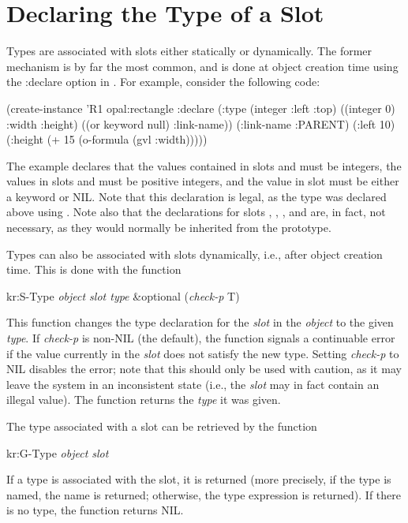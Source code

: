 \section{Declaring the Type of a Slot}


Types are associated with slots either statically or dynamically.  The
former mechanism is by far the most common, and is done at object
creation time using the {\sc :declare} option in .
For example, consider the following code:

\vspace{1 line}
\begin{programexample}
(create-instance 'R1 opal:rectangle
  :declare (:type (integer :left :top)
		  ((integer 0) :width :height)
		  ((or keyword null) :link-name))
  (:link-name :PARENT)
  (:left 10) (:height (+ 15 (o-formula (gvl :width)))))
\end{programexample}

The example declares that the values contained in slots  and
 must be integers, the values in slots  and
 must be positive integers, and the value in slot
 must be either a keyword or NIL.  Note that this
declaration is legal, as the type  was declared
above using .  Note also that the declarations for
slots , , , and  are, in fact,
not necessary, as they would normally be inherited from the prototype.


Types can also be associated with slots dynamically, i.e., after
object creation time.  This is done with the function
\begin{example}
kr:S-Type {\it object slot type} \&optional ({\it check-p} T) \value{function}
\end{example}

This function changes the type declaration for the {\it slot} in the
{\it object} to the given {\it type}.  If {\it check-p} is non-NIL (the
default), the function signals a continuable error if the value
currently in the {\it slot} does not satisfy the new type.  Setting
{\it check-p} to NIL disables the error; note that this should only be
used with caution, as it may leave the system in an inconsistent state
(i.e., the {\it slot} may in fact contain an illegal value).  The
function returns the {\it type} it was given.


The type associated with a slot can be retrieved by the function
\begin{example}
kr:G-Type {\it object slot}	\value{function}
\end{example}
If a type is associated with the slot, it is returned (more precisely,
if the type is named, the name is returned; otherwise, the type
expression is returned).  If there is no type, the function returns
NIL.


